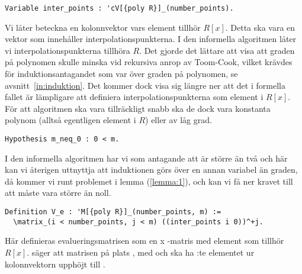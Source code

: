 
\begin{lstlisting}
Variable inter_points : 'cV[{poly R}]_(number_points).
\end{lstlisting}

Vi låter  beteckna en kolonnvektor vars element tillhör $R[x]$.
Detta ska vara en vektor som innehåller interpolationspunkterna. I den
informella algoritmen låter vi interpolationspunkterna tillhöra $R$. Det gjorde
det lättare att visa att graden på polynomen skulle minska vid rekursiva anrop
av Toom-Cook, vilket krävdes för induktionsantagandet som var över graden på
polynomen, se avsnitt~\ref{in:induktion}. Det kommer dock visa sig längre ner
att det i formella fallet är lämpligare att definiera interpolationspunkterna
som element i $R[x]$. För att algoritmen ska vara tillräckligt snabb ska de
dock vara konstanta polynom (alltså egentligen element i $R$) eller av låg
grad.


\begin{lstlisting}
Hypothesis m_neq_0 : 0 < m.
\end{lstlisting}

I den informella algoritmen har vi som antagande att  är större än två och
här kan vi återigen uttnyttja att induktionen görs över en annan variabel än
graden, då kommer vi runt problemet i lemma (\ref{lemma:1}), och kan vi få ner
kravet till att  måste vara större än noll.

\begin{lstlisting}
Definition V_e : 'M[{poly R}]_(number_points, m) :=
  \matrix_(i < number_points, j < m) ((inter_points i 0))^+j.
\end{lstlisting}
Här definieras evalueringsmatrisen  som en  x -matris
med element som tillhör $R[x]$.
 säger att matrisen
på plats , med  och  ska ha :te
elementet ur kolonnvektorn  upphöjt till .

